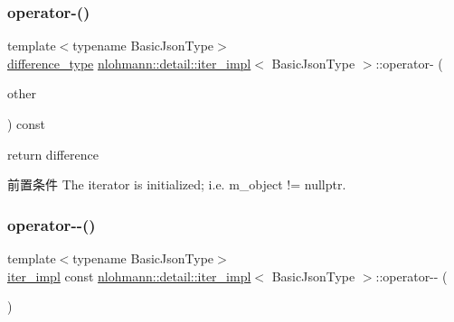 \subsubsection{\texorpdfstring{operator-\/()}{operator-()}\hspace{0.1cm}{\footnotesize\ttfamily [2/2]}}
{\footnotesize\ttfamily template$<$typename Basic\+Json\+Type$>$ \\
\mbox{\hyperlink{classnlohmann_1_1detail_1_1iter__impl_a2f7ea9f7022850809c60fc3263775840}{difference\+\_\+type}} \mbox{\hyperlink{classnlohmann_1_1detail_1_1iter__impl}{nlohmann\+::detail\+::iter\+\_\+impl}}$<$ Basic\+Json\+Type $>$\+::operator-\/ (\begin{DoxyParamCaption}\item[{const \mbox{\hyperlink{classnlohmann_1_1detail_1_1iter__impl}{iter\+\_\+impl}}$<$ Basic\+Json\+Type $>$ \&}]{other }\end{DoxyParamCaption}) const\hspace{0.3cm}{\ttfamily [inline]}}



return difference 

\begin{DoxyPrecond}{前置条件}
The iterator is initialized; i.\+e. {\ttfamily m\+\_\+object != nullptr}. 
\end{DoxyPrecond}
\mbox{\label{classnlohmann_1_1detail_1_1iter__impl_a1fc43e764467b8ea4a4cdd01f629d757}} 
\subsubsection{\texorpdfstring{operator-\/-\/()}{operator--()}\hspace{0.1cm}{\footnotesize\ttfamily [1/2]}}
{\footnotesize\ttfamily template$<$typename Basic\+Json\+Type$>$ \\
\mbox{\hyperlink{classnlohmann_1_1detail_1_1iter__impl}{iter\+\_\+impl}} const \mbox{\hyperlink{classnlohmann_1_1detail_1_1iter__impl}{nlohmann\+::detail\+::iter\+\_\+impl}}$<$ Basic\+Json\+Type $>$\+::operator-\/-\/ (\begin{DoxyParamCaption}\item[{int}]{ }\end{DoxyParamCaption})\hspace{0.3cm}{\ttfamily [inline]}}



